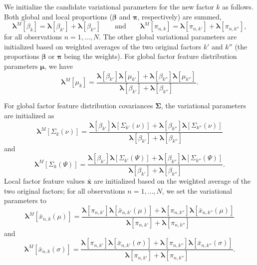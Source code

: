 \documentclass[twoside,11pt]{article}
\begin{document}
We initialize the candidate variational parameters for the new factor $k$ as follows.  Both global and local proportions ($\boldsymbol{\beta}$ and $\boldsymbol{\pi}$, respectively) are summed,
\begin{equation}
     \boldsymbol{\lambda}^M[{\beta}_{k}] =  \boldsymbol{\lambda}[{\beta}_{k'}] + \boldsymbol{\lambda}[{\beta}_{k''}]
        \qquad \mbox{and} \qquad
    \boldsymbol{\lambda}^M[{\pi}_{n,k}] = 
    \boldsymbol{\lambda}[{\pi}_{n,k'}] +  
    \boldsymbol{\lambda}[{\pi}_{n,k''}],
    \label{eq:M1}
\end{equation}
for all observations $n=1,\dots,N$.  The other global variational parameters are initialized based on weighted averages of the two original factors $k'$ and $k''$ (the proportions $\boldsymbol{\beta}$ or $\boldsymbol{\pi}$ being the weights).  For global factor feature distribution parameters $\boldsymbol{\mu}$, we have
\begin{equation}
     \boldsymbol{\lambda}^M[\mu_{k}] =  \frac{\boldsymbol{\lambda}[\beta_{k'}]\boldsymbol{\lambda}[\mu_{k'}] + \boldsymbol{\lambda}[\beta_{k''}]\boldsymbol{\lambda}[\mu_{k''}]}{
     \boldsymbol{\lambda}[\beta_{k'}] + \boldsymbol{\lambda}[\beta_{k''}]}.
     \label{eq:M2}
\end{equation}

For global factor feature distribution covariances $\boldsymbol{\Sigma}$, the variational parameters are initialized as
\begin{equation}
     \boldsymbol{\lambda}^M[\Sigma_{k}(\nu)] =  \frac{\boldsymbol{\lambda}[\beta_{k'}]\boldsymbol{\lambda}[\Sigma_{k'}(\nu)] + \boldsymbol{\lambda}[\beta_{k''}]\boldsymbol{\lambda}[\Sigma_{k''}(\nu)]}{
     \boldsymbol{\lambda}[\beta_{k'}] + \boldsymbol{\lambda}[\beta_{k''}]}
     \label{eq:M3}
\end{equation}
and
\begin{equation}
     \boldsymbol{\lambda}^M[\Sigma_{k}(\Psi)] =  \frac{\boldsymbol{\lambda}[\beta_{k'}]\boldsymbol{\lambda}[\Sigma_{k'}(\Psi)] + \boldsymbol{\lambda}[\beta_{k''}]\boldsymbol{\lambda}[\Sigma_{k''}(\Psi)]}{
     \boldsymbol{\lambda}[\beta_{k'}] + \boldsymbol{\lambda}[\beta_{k''}]}.
     \label{eq:M4}
\end{equation}
Local factor feature values $\boldsymbol{\bar{x}}$ are initialized based on the weighted average of the two original factors; for all observations $n=1,\dots,N$, we set the variational parameters to
\begin{equation}
    \boldsymbol{\lambda}^M[\bar{x}_{n,k}(\mu)] =  \frac{\boldsymbol{\lambda}[\pi_{n,k'}]\boldsymbol{\lambda}[\bar{x}_{n,k'}(\mu)] + \boldsymbol{\lambda}[\pi_{n,k''}]\boldsymbol{\lambda}[\bar{x}_{n,k''}(\mu)]}{
    \boldsymbol{\lambda}[\pi_{n,k'}] + \boldsymbol{\lambda}[\pi_{n,k''}]}
    \label{eq:M5}
\end{equation}
and
\begin{equation}
    \boldsymbol{\lambda}^M[\bar{x}_{n,k}(\sigma)] =  \frac{\boldsymbol{\lambda}[\pi_{n,k'}]\boldsymbol{\lambda}[\bar{x}_{n,k'}(\sigma)] + \boldsymbol{\lambda}[\pi_{n,k''}]\boldsymbol{\lambda}[\bar{x}_{n,k''}(\sigma)]}{
    \boldsymbol{\lambda}[\pi_{n,k'}] + \boldsymbol{\lambda}[\pi_{n,k''}]}.
    \label{eq:M6}
\end{equation}
\end{document}
